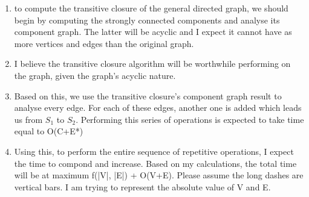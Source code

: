 \documentclass[11pt]{article}
\begin{document}
\begin{enumerate}
\begin{enumerate}
    \item to compute the transitive closure of the general directed graph, we should begin by computing the strongly connected components and analyse its component graph. The latter will be acyclic and I expect it cannot have as more vertices and edges than the original graph.
    \item I believe the transitive closure algorithm will be worthwhile performing on the graph, given the graph's acyclic nature. 
    \item Based on this, we use the transitive closure's component graph result to analyse every edge. For each of these edges, another one is added which leads us from $S_1$ to $S_2$. Performing this series of operations is expected to take time equal to O(C+E*)
    \item Using this, to perform the entire sequence of repetitive operations, I expect the time to compond and increase. Based on my calculations, the total time will be at maximum f(|V|, |E|) + O(V+E). Please assume the long dashes are vertical bars. I am trying to represent the absolute value of V and E.
\end{enumerate}
\pagebreak


\end{enumerate}
\end{document}
